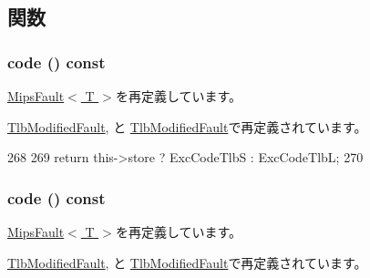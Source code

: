 \subsection{関数}
\hypertarget{classMipsISA_1_1TlbFault_a1dd20a2460d7723d3eaa287b7cc07e79}{
\subsubsection[{code}]{ code () const}}
\label{classMipsISA_1_1TlbFault_a1dd20a2460d7723d3eaa287b7cc07e79}


\hyperlink{classMipsISA_1_1MipsFault_a1dd20a2460d7723d3eaa287b7cc07e79}{MipsFault$<$ T $>$}を再定義しています。

\hyperlink{classMipsISA_1_1TlbModifiedFault_a1dd20a2460d7723d3eaa287b7cc07e79}{TlbModifiedFault}, と \hyperlink{classMipsISA_1_1TlbModifiedFault_a1dd20a2460d7723d3eaa287b7cc07e79}{TlbModifiedFault}で再定義されています。


\begin{DoxyCode}
268     {
269         return this->store ? ExcCodeTlbS : ExcCodeTlbL;
270     }
\end{DoxyCode}
\hypertarget{classMipsISA_1_1TlbFault_a1dd20a2460d7723d3eaa287b7cc07e79}{
\subsubsection[{code}]{ code () const}}
\label{classMipsISA_1_1TlbFault_a1dd20a2460d7723d3eaa287b7cc07e79}


\hyperlink{classMipsISA_1_1MipsFault_a1dd20a2460d7723d3eaa287b7cc07e79}{MipsFault$<$ T $>$}を再定義しています。

\hyperlink{classMipsISA_1_1TlbModifiedFault_a1dd20a2460d7723d3eaa287b7cc07e79}{TlbModifiedFault}, と \hyperlink{classMipsISA_1_1TlbModifiedFault_a1dd20a2460d7723d3eaa287b7cc07e79}{TlbModifiedFault}で再定義されています。



